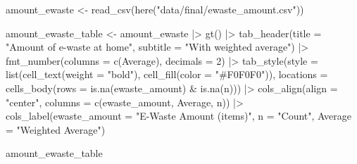 \documentclass[
  letterpaper,
  DIV=11,
  numbers=noendperiod]{scrartcl}
\newenvironment{Shaded}{\begin{snugshade}}{\end{snugshade}}
\newcommand{\AttributeTok}[1]{\textcolor[rgb]{0.40,0.45,0.13}{#1}}
\newcommand{\DecValTok}[1]{\textcolor[rgb]{0.68,0.00,0.00}{#1}}
\newcommand{\FunctionTok}[1]{\textcolor[rgb]{0.28,0.35,0.67}{#1}}
\newcommand{\NormalTok}[1]{\textcolor[rgb]{0.00,0.23,0.31}{#1}}
\newcommand{\OtherTok}[1]{\textcolor[rgb]{0.00,0.23,0.31}{#1}}
\newcommand{\SpecialCharTok}[1]{\textcolor[rgb]{0.37,0.37,0.37}{#1}}
\newcommand{\StringTok}[1]{\textcolor[rgb]{0.13,0.47,0.30}{#1}}
\begin{document}
\begin{Shaded}
\begin{Highlighting}[]
\NormalTok{amount\_ewaste }\OtherTok{\textless{}{-}} \FunctionTok{read\_csv}\NormalTok{(}\FunctionTok{here}\NormalTok{(}\StringTok{"data/final/ewaste\_amount.csv"}\NormalTok{))}

\NormalTok{amount\_ewaste\_table }\OtherTok{\textless{}{-}}\NormalTok{ amount\_ewaste }\SpecialCharTok{|\textgreater{}} 
  \FunctionTok{gt}\NormalTok{() }\SpecialCharTok{|\textgreater{}} 
  \FunctionTok{tab\_header}\NormalTok{(}\AttributeTok{title =} \StringTok{"Amount of e{-}waste at home"}\NormalTok{, }\AttributeTok{subtitle =} \StringTok{"With weighted average"}\NormalTok{) }\SpecialCharTok{|\textgreater{}} 
  \FunctionTok{fmt\_number}\NormalTok{(}\AttributeTok{columns =} \FunctionTok{c}\NormalTok{(Average),}
             \AttributeTok{decimals =} \DecValTok{2}\NormalTok{) }\SpecialCharTok{|\textgreater{}} 
   \FunctionTok{tab\_style}\NormalTok{(}\AttributeTok{style =} \FunctionTok{list}\NormalTok{(}\FunctionTok{cell\_text}\NormalTok{(}\AttributeTok{weight =} \StringTok{"bold"}\NormalTok{), }
                          \FunctionTok{cell\_fill}\NormalTok{(}\AttributeTok{color =} \StringTok{"\#F0F0F0"}\NormalTok{)),}
             \AttributeTok{locations =} \FunctionTok{cells\_body}\NormalTok{(}\AttributeTok{rows =} \FunctionTok{is.na}\NormalTok{(ewaste\_amount) }\SpecialCharTok{\&} \FunctionTok{is.na}\NormalTok{(n))) }\SpecialCharTok{|\textgreater{}} 
    \FunctionTok{cols\_align}\NormalTok{(}\AttributeTok{align =} \StringTok{"center"}\NormalTok{,}
             \AttributeTok{columns =} \FunctionTok{c}\NormalTok{(ewaste\_amount, Average, n)) }\SpecialCharTok{|\textgreater{}} 
  \FunctionTok{cols\_label}\NormalTok{(}\AttributeTok{ewaste\_amount =} \StringTok{"E{-}Waste Amount (items)"}\NormalTok{,}
             \AttributeTok{n =} \StringTok{"Count"}\NormalTok{,}
             \AttributeTok{Average =} \StringTok{"Weighted Average"}\NormalTok{)}

\NormalTok{amount\_ewaste\_table}
\end{Highlighting}
\end{Shaded}
\end{document}
